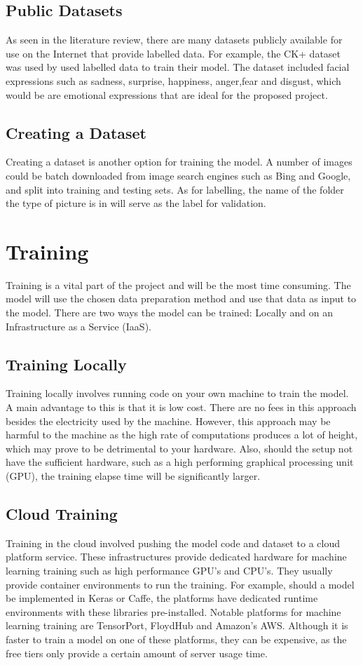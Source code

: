 \subsection{Public Datasets}
As seen in the literature review, there are many datasets publicly available for use on the Internet that provide labelled data. For example, the CK+ dataset was used by \citeauthor{LOPES} used labelled data to train their model. The dataset included facial expressions such as sadness, surprise, happiness, anger,fear and disgust, which would be are emotional expressions that are ideal for the proposed project.

\subsection{Creating a Dataset}
Creating a dataset is another option for training the model. A number of images could be batch downloaded from image search engines such as Bing and Google, and split into training and testing sets. As for labelling, the name of the folder the type of picture is in will serve as the label for validation.

\section{Training}
Training is a vital part of the project and will be the most time consuming. The model will use the chosen data preparation method and use that data as input to the model. There are two ways the model can be trained: Locally and on an Infrastructure as a Service (IaaS).
\subsection{Training Locally}
Training locally involves running code on your own machine to train the model. A main advantage to this is that it is low cost. There are no fees in this approach besides the electricity used by the machine. However, this approach may be harmful to the machine as the high rate of computations produces a lot of height, which may prove to be detrimental to your hardware. Also, should the setup not have the sufficient hardware, such as a high performing graphical processing unit (GPU), the training elapse time will be significantly larger.

\subsection{Cloud Training}
Training in the cloud involved pushing the model code and dataset to a cloud platform service. These infrastructures provide dedicated hardware for machine learning training such as high performance GPU's and CPU's. They usually provide container environments to run the training. For example, should a model be implemented in Keras or Caffe, the platforms have dedicated runtime environments with these libraries pre-installed. Notable platforms for machine learning training are TensorPort, FloydHub and Amazon's AWS. Although it is faster to train a model on one of these platforms, they can be expensive, as the free tiers only provide a certain amount of server usage time.


